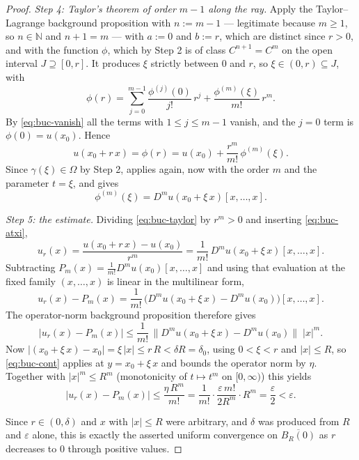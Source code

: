 \begin{proof}
\medskip\noindent\emph{Step 4: Taylor's theorem of order $m-1$ along the ray.}
Apply the Taylor--Lagrange background proposition with $n:=m-1$ --- legitimate because $m\ge1$,
so $n\in\mathbb{N}$ and $n+1=m$ --- with $a:=0$ and $b:=r$, which are distinct since $r>0$, and
with the function $\phi$, which by Step 2 is of class $C^{n+1}=C^{m}$ on the open interval
$J\supseteq[0,r]$.  It produces $\xi$ strictly between $0$ and $r$, so $\xi\in(0,r)\subseteq J$,
with
\[
  \phi(r)=\sum_{j=0}^{m-1}\frac{\phi^{(j)}(0)}{j!}\,r^{j}
          +\frac{\phi^{(m)}(\xi)}{m!}\,r^{m} .
\]
By \eqref{eq:buc-vanish} all the terms with $1\le j\le m-1$ vanish, and the $j=0$ term is
$\phi(0)=u(x_0)$.  Hence
\begin{equation}\label{eq:buc-taylor}
  u(x_0+r\,x)=\phi(r)=u(x_0)+\frac{r^{m}}{m!}\,\phi^{(m)}(\xi).
\end{equation}
Since $\gamma(\xi)\in\Omega$ by Step 2,  applies again, now with
the order $m$ and the parameter $t=\xi$, and gives
\begin{equation}\label{eq:buc-atxi}
  \phi^{(m)}(\xi)=D^{m}u(x_0+\xi\,x)[x,\ldots,x].
\end{equation}

\medskip\noindent\emph{Step 5: the estimate.}
Dividing \eqref{eq:buc-taylor} by $r^{m}>0$ and inserting \eqref{eq:buc-atxi},
\[
  u_r(x)=\frac{u(x_0+r\,x)-u(x_0)}{r^{m}}
        =\frac{1}{m!}\,D^{m}u(x_0+\xi\,x)[x,\ldots,x].
\]
Subtracting $P_m(x)=\frac1{m!}D^{m}u(x_0)[x,\ldots,x]$ and using that evaluation at the fixed
family $(x,\ldots,x)$ is linear in the multilinear form,
\[
  u_r(x)-P_m(x)=\frac{1}{m!}\,\bigl(D^{m}u(x_0+\xi\,x)-D^{m}u(x_0)\bigr)[x,\ldots,x].
\]
The operator-norm background proposition therefore gives
\[
  \lvert u_r(x)-P_m(x)\rvert
  \le\frac{1}{m!}\,\bigl\lVert D^{m}u(x_0+\xi\,x)-D^{m}u(x_0)\bigr\rVert\;\lvert x\rvert^{m}.
\]
Now $\lvert(x_0+\xi\,x)-x_0\rvert=\xi\,\lvert x\rvert\le r\,R<\delta R=\delta_0$, using
$0<\xi<r$ and $\lvert x\rvert\le R$, so \eqref{eq:buc-cont} applies at $y=x_0+\xi\,x$ and bounds
the operator norm by $\eta$.  Together with $\lvert x\rvert^{m}\le R^{m}$ (monotonicity of
$t\mapsto t^{m}$ on $[0,\infty)$) this yields
\[
  \lvert u_r(x)-P_m(x)\rvert
  \le\frac{\eta\,R^{m}}{m!}
  =\frac{1}{m!}\cdot\frac{\varepsilon\,m!}{2R^{m}}\cdot R^{m}
  =\frac{\varepsilon}{2}<\varepsilon .
\]

\medskip\noindent Since $r\in(0,\delta)$ and $x$ with $\lvert x\rvert\le R$ were arbitrary, and
$\delta$ was produced from $R$ and $\varepsilon$ alone, this is exactly the asserted uniform
convergence on $\overline{B_R(0)}$ as $r$ decreases to $0$ through positive values.
\end{proof}
